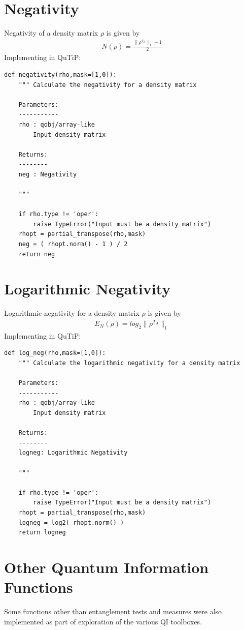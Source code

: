 \section{Negativity}
Negativity of a density matrix $\rho$ is given by
\begin{align*}
N(\rho) = \frac{\lVert \rho^{T_A} \rVert_1 - 1}{2}
\end{align*}
Implementing in QuTiP:
\begin{verbatim}
def negativity(rho,mask=[1,0]):
    """ Calculate the negativity for a density matrix
    
    Parameters:
    -----------
    rho : qobj/array-like
        Input density matrix
    
    Returns:
    --------
    neg : Negativity
    
    """
    
    if rho.type != 'oper':
        raise TypeError("Input must be a density matrix")
    rhopt = partial_transpose(rho,mask)
    neg = ( rhopt.norm() - 1 ) / 2
    return neg
\end{verbatim}

\section{Logarithmic Negativity}
Logarithmic negativity for a density matrix $\rho$ is given by
\begin{align*}
E_N(\rho) = log_2 \lVert \rho^{T_A} \rVert_1
\end{align*}
Implementing in QuTiP:
\begin{verbatim}
def log_neg(rho,mask=[1,0]):
    """ Calculate the logarithmic negativity for a density matrix
    
    Parameters:
    -----------
    rho : qobj/array-like
        Input density matrix
    
    Returns:
    --------
    logneg: Logarithmic Negativity
    
    """
    
    if rho.type != 'oper':
        raise TypeError("Input must be a density matrix")
    rhopt = partial_transpose(rho,mask)
    logneg = log2( rhopt.norm() )
    return logneg
\end{verbatim}


\section{Other Quantum Information Functions}
\par Some functions other than entanglement tests and measures were also implemented as part of exploration of the various QI toolboxes.
